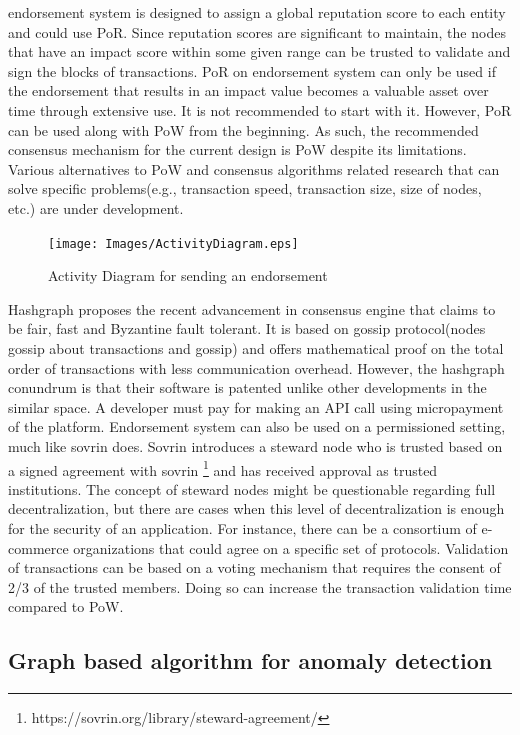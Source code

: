 endorsement system is designed to assign a global reputation score to each
entity and could use PoR. Since reputation scores are significant to maintain,
the nodes that have an impact score within some given range can be trusted to
validate and sign the blocks of transactions. PoR on endorsement system can
only be used if the endorsement that results in an impact value becomes a
valuable asset over time through extensive use. It is not recommended to start
with it. However, PoR can be used along with PoW from the beginning. As such,
the recommended consensus mechanism for the current design is PoW despite its
limitations. Various alternatives to PoW and consensus algorithms related
research that can solve specific problems(e.g., transaction speed, transaction
size, size of nodes, etc.) are under development. 
\begin{figure}[h]
	\centering
	\texttt{[image: Images/ActivityDiagram.eps]}
	\caption{Activity Diagram for sending an endorsement}
	\label{fig:activity}
\end{figure}
Hashgraph \cite{baird2016hashgraph}  proposes the recent advancement in
consensus engine that claims to be fair, fast and Byzantine fault tolerant. It
is based on gossip protocol(nodes gossip about transactions and gossip) and
offers mathematical proof on the total order of transactions with less
communication overhead. However, the hashgraph conundrum is that their software
is patented unlike other developments in the similar space. A developer must
pay for making an API call using micropayment of the platform.  Endorsement
system can also be used on a permissioned setting, much like sovrin
\cite{tobin2016inevitable} does.  Sovrin introduces a steward node who is
trusted based on a signed agreement with sovrin
\footnote{https://sovrin.org/library/steward-agreement/} and has received
approval as trusted institutions. The concept of steward nodes might be
questionable regarding full decentralization, but there are cases when this
level of decentralization is enough for the security of an application.   For
instance, there can be a consortium of e-commerce organizations that could
agree on a specific set of protocols. Validation of transactions can be based
on a voting mechanism that requires the consent of 2/3 of the trusted members.
Doing so can increase the transaction validation time compared to PoW.   

\subsection{Graph based algorithm for anomaly detection}

